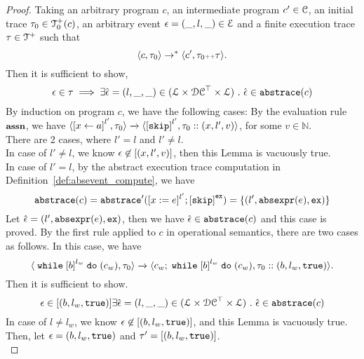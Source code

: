  \begin{proof}
    Taking an arbitrary program $c$, an intermediate program $c' \in \mathcal{C}$, an initial trace $\mathtt{\tau}_0 \in \mathcal{T}^{+}_0(c)$, an arbitrary event $\mathtt{\epsilon} = (\_, l, \_) \in \mathcal{E}$ and a finite execution trace $\mathtt{\tau} \in \mathcal{T}^{+}$
    such that
    \[
      \langle {c}, \mathtt{\tau}_0 \rangle \to^{*} \langle c', \mathtt{\tau}_0 {\scriptscriptstyle ++} \mathtt{\tau} \rangle.
    \]
    Then it is sufficient to show,
    \[
      \mathtt{\epsilon} \in \mathtt{\tau}  \implies
      \exists \hat{\mathtt{\epsilon}{}} = (l, \_, \_) \in (\mathcal{L}\times \mathcal{DC}^{\top} \times \mathcal{L}) ~.~ 
      \hat{\mathtt{\epsilon}{}} \in \mathtt{abs}{\mathtt{trace}}(c)
    \]
    By induction on program $c$, we have the following cases:
    By the evaluation rule $\textbf{\small{assn}}$, we have
    $
    {
    \config{\clabel{\assign{{x}}{\aexpr}}^{l'},  \trace_0 } 
    \xrightarrow{} 
    \config{\clabel{\eskip}^{l'}, \trace_0 :: ({x}, l', v)}
    }$, for some $v \in \mathbb{N}$.
    \\
    There are 2 cases, where $l' = l$ and $l' \neq l$.
    \\
    In case of $l' \neq l$, we know $\mathtt{\epsilon} \not\in [({x}, l', v)]$, then this Lemma is vacuously true.
    \\
    In case of $l' = l$, by the abstract execution trace computation in Definition~\ref{def:absevent_compute}, we have 
    \[
      \absflow(c) = \absflow'([x := \expr]^{l'}; \clabel{\eskip}^{\lex}) = \{(l', \absexpr(\expr), \lex)\}
    \]
    Let $\hat{\mathtt{\epsilon}{}} = (l', \mathtt{abs}{\mathtt{expr}}(e), \mathtt{ex}) $, then we have $\hat{\mathtt{\epsilon}{}} \in \mathtt{abs}{\mathtt{trace}}(c)$ and this case is proved.
    By the first rule applied to $c$ in operational semantics, there are two cases as follows.
    In this case, we have
    \[
      \config{{\ewhile \clabel{b}^{l_w} \edo (c_w), \trace_0}}
      \xrightarrow{} 
      \config{{
      c_w; \ewhile \clabel{b}^{l_w} \edo (c_w),
      \trace_0 :: (b, l_w, \etrue)}}.
    \]
      Then it is sufficient to show.
      \[
        \mathtt{\epsilon} \in [(b, l_w, \mathtt{true})]
        \exists \hat{\mathtt{\epsilon}{}} = (l, \_, \_) \in (\mathcal{L}\times \mathcal{DC}^{\top} \times \mathcal{L}) ~.~ 
        \hat{\mathtt{\epsilon}{}} \in \mathtt{abs}{\mathtt{trace}}(c)
      \]
      In case of $l \neq l_w$, we know $\mathtt{\epsilon} \not \in [(b, l_w, \mathtt{true})]$, and this Lemma is vacuously true.
      \\
      Then, let $\mathtt{\epsilon} = (b, l_w, \mathtt{true})$ and $\mathtt{\tau}' =  [(b, l_w, \mathtt{true})]$. 
      \\

\end{proof}
